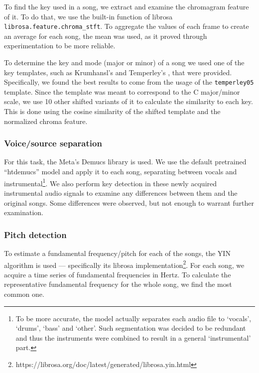 \documentclass[
  letterpaper,
  twocolumn]{article}
\begin{document}
To find the key used in a song, we extract and examine the chromagram
feature of it. To do that, we use the built-in function of librosa
\autocite{mcfeeLibrosaLibrosa102024}
\texttt{librosa.feature.chroma_stft}. To aggregate the
values of each frame to create an average for each song, the mean was
used, as it proved through experimentation to be more reliable.

To determine the key and mode (major or minor) of a song we used one of
the key templates, such as Krumhansl's
\autocite{krumhanslCognitiveFoundationsMusical1990} and Temperley's
\autocite{temperleyWhatKeyKey1999}, that were provided. Specifically, we
found the best results to come from the usage of the
\texttt{temperley05} template. Since the template was meant
to correspond to the C major/minor scale, we use 10 other shifted
variants of it to calculate the similarity to each key. This is done
using the cosine similarity of the shifted template and the normalized
chroma feature.

\subsubsection{Voice/source separation}\label{voicesource-separation}

For this task, the Meta's Demucs library
\autocite{FacebookresearchDemucs2024,rouard2022hybrid} is used. We use
the default pretrained ``htdemucs'' model and apply it to each song,
separating between vocals and instrumental\footnote{To be more accurate,
  the model actually separates each audio file to `vocals', `drums',
  `bass' and `other'. Such segmentation was decided to be redundant and
  thus the instruments were combined to result in a general
  `instrumental' part.}. We also perform key detection in these newly
acquired instrumental audio signals to examine any differences between
them and the original songs. Some differences were observed, but not
enough to warrant further examination.

\subsubsection{Pitch detection}\label{pitch-detection}

To estimate a fundamental frequency/pitch for each of the songs, the YIN
algorithm \autocite{decheveigneYINFundamentalFrequency2002} is used ---
specifically its librosa implementation\footnote{https://librosa.org/doc/latest/generated/librosa.yin.html}.
For each song, we acquire a time series of fundamental frequencies in
Hertz. To calculate the representative fundamental frequency for the
whole song, we find the most common one.
\end{document}
